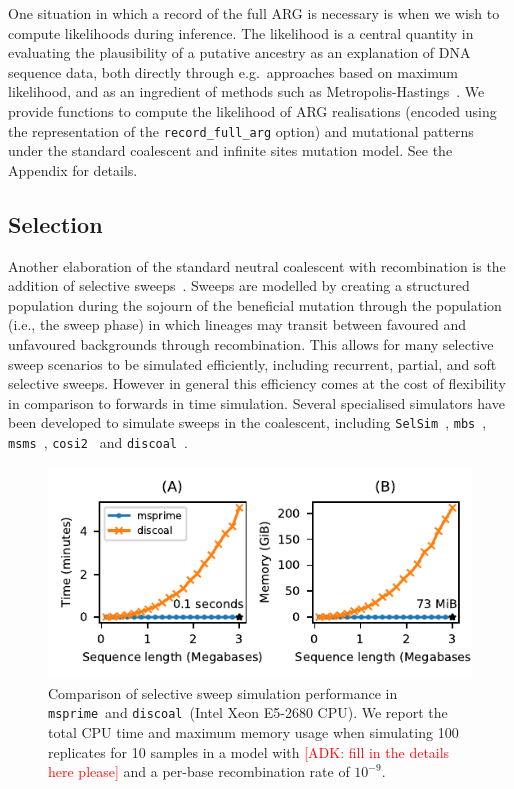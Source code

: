 \documentclass{article}
\newcommand{\msprime}[0]{\texttt{msprime}}
\newcommand{\msms}[0]{\texttt{msms}}
\newcommand{\cosiTwo}[0]{\texttt{cosi2}}
\newcommand{\discoal}[0]{\texttt{discoal}}
\newcommand{\jkcomment}[1]{\textcolor{red}{#1}}
\begin{document}
One situation in which a record of the full ARG is necessary is when we
wish to compute likelihoods during inference.
The likelihood is a central quantity in evaluating the plausibility of a putative
ancestry as an explanation of DNA sequence data, both directly through
e.g.~approaches based on maximum likelihood, and as an ingredient of
methods such as
Metropolis-Hastings~\citep{kuhner2000maximum,nielsen2000estimation,wang2008bayesian}.
We provide functions to compute the likelihood of ARG realisations
(encoded using the representation of the \texttt{record\_full\_arg} option)
and mutational patterns under
the standard coalescent and infinite sites mutation model.
See the Appendix for details.

\subsection*{Selection}
\label{sec-selection}
Another elaboration of the standard neutral coalescent with recombination
is the addition of selective
sweeps~\citep{kaplan1989hitchhiking,braverman1995hitchhiking,kim2002detecting}.
Sweeps are modelled by creating a structured population
during the sojourn of the beneficial mutation through the population (i.e., the sweep phase)
in which lineages may transit between favoured and unfavoured backgrounds through
recombination. This allows for many selective sweep scenarios to be simulated
efficiently, including recurrent, partial, and soft selective sweeps.
However in general this
efficiency comes at the cost of flexibility in comparison to forwards in
time simulation.
Several specialised simulators have been developed to simulate
sweeps in the coalescent,
including \texttt{SelSim}~\citep{spencer2004selsim},
\texttt{mbs}~\citep{teshima2009mbs}, \msms~\citep{ewing2010msms},
\cosiTwo~\citep{shlyakhter2014cosi2}
and \discoal~\citep{kern2016discoal}.

\begin{figure}
\begin{center}
\includegraphics[width=\textwidth]{figures/sweeps-perf}
\end{center}
\caption{\label{fig-selection-perf}Comparison of selective sweep simulation
performance in \msprime\ and \discoal\ (Intel Xeon E5-2680 CPU).
We report the total CPU time and maximum memory usage when simulating 100
replicates for 10 samples in a model
with \jkcomment{[ADK: fill in the details here please]} and a
per-base recombination rate of $10^{-9}$.}
\end{figure}
\end{document}
